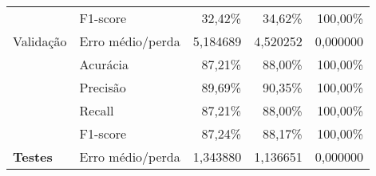 \begin{table}[ht!]
{\begin{tabular}{l|l|r|r|r}
                                              & F1-score                                 & 32,42\%                          & 34,62\%                          & 100,00\%                         \\
            \multirow{-5}{*}{Validação}       & Erro médio/perda                         & 5,184689                         & 4,520252                         & 0,000000                         \\ \hline
                                              & \cellcolor[HTML]{FFF5E1}Acurácia         & \cellcolor[HTML]{FFF5E1}87,21\%  & \cellcolor[HTML]{FFF5E1}88,00\%  & \cellcolor[HTML]{FFF5E1}100,00\% \\
                                              & Precisão                                 & 89,69\%                          & 90,35\%                          & 100,00\%                         \\
                                              & Recall                                   & 87,21\%                          & 88,00\%                          & 100,00\%                         \\
                                              & F1-score                                 & 87,24\%                          & 88,17\%                          & 100,00\%                         \\
            \multirow{-5}{*}{\textbf{Testes}} & \cellcolor[HTML]{FFF5E1}Erro médio/perda & \cellcolor[HTML]{FFF5E1}1,343880 & \cellcolor[HTML]{FFF5E1}1,136651 & \cellcolor[HTML]{FFF5E1}0,000000 \\ \hline
        \end{tabular}%
    }
    \nomefonte{}
\end{table}